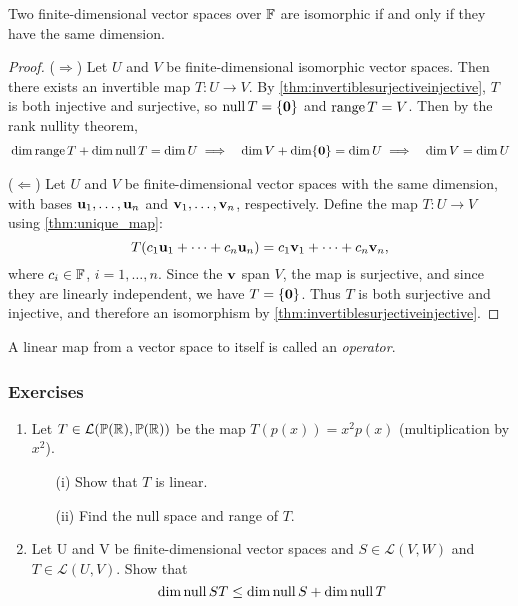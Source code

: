 \documentclass{article}
\begin{document}
\begin{theorem}
Two finite-dimensional vector spaces over ${\mathbb{F}}$ are isomorphic if and only if they have the same dimension.
\end{theorem}
\begin{proof}
($\Rightarrow$) Let $U$ and $V$ be finite-dimensional isomorphic vector spaces. Then there exists an invertible map $T: U \to V$. By \cref{thm:invertiblesurjectiveinjective}, $T$ is both injective and surjective, so $\operatorname{null} T = \{ {\mathbf{0}} \}$ and $\operatorname{range} T = V$. Then by the rank nullity theorem, 
\begin{align*}
    & \dim \operatorname{range} T + \dim \operatorname{null} T = \dim U 
     \implies &\dim V + \dim \{ {\mathbf{0}} \} = \dim U
    & \implies &\dim V = \dim U
\end{align*}

($\Leftarrow$) Let $U$ and $V$ be finite-dimensional vector spaces with the same dimension, with bases ${\mathbf{u}}_1, \ldots, {\mathbf{u}}_n$ and ${\mathbf{v}}_1, \ldots, {\mathbf{v}}_n$, respectively. Define the map $T:U \to V$ using \cref{thm:unique_map}:
$$ T(c_1 {\mathbf{u}}_1 + \cdots + c_n {\mathbf{u}}_n) =  c_1 {\mathbf{v}}_1 + \cdots + c_n {\mathbf{v}}_n,$$
where $c_i \in {\mathbb{F}}$, $i=1,\ldots,n$. Since the ${\mathbf{v}}$ span $V$, the map is surjective, and since they are linearly independent, we have $\null T = \{ \zerovec \}$. Thus $T$ is both surjective and injective, and therefore an isomorphism by \cref{thm:invertiblesurjectiveinjective}.
\end{proof}

\begin{definition}
A linear map from a vector space to itself is called an \emph{operator}.
\end{definition}

\subsubsection{Exercises}

\begin{enumerate}
\item Let $T \in {\mathcal{L}}(\mathbb{P}({\mathbb{R}}),\mathbb{P}({\mathbb{R}}))$ be the map $T (p(x))= x^2 p(x)$ (multiplication by $x^2$). 
\begin{enumerate}
    \item[(i)] Show that $T$ is linear.
    \item[(ii)] Find the null space and range of $T$.
\end{enumerate}
\item \cite[3.B Exercise 22]{linalgright} Let U and V be finite-dimensional vector spaces and $S \in \mathcal{L}(V,W)$ and $T \in \mathcal{L}(U,V)$. Show that 
\begin{equation*}
    \dim \operatorname{null} ST \leq \dim \operatorname{null} S + \dim \operatorname{null} T
\end{equation*}

\end{enumerate}
\end{document}
